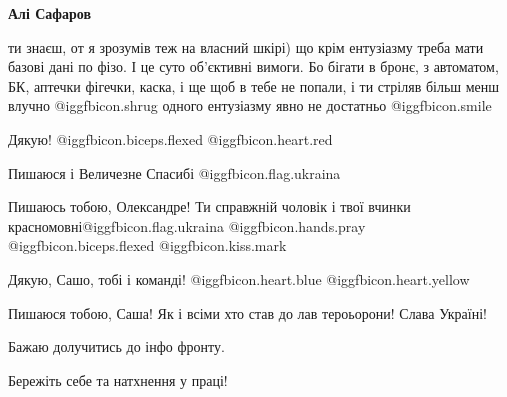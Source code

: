 \begin{itemize}
\begin{itemize}
\textbf{Алі Сафаров} 

ти знаєш, от я зрозумів теж на власний шкірі) що крім ентузіазму треба мати
базові дані по фізо. І це суто об'єктивні вимоги. Бо бігати в бронє, з
автоматом, БК, аптечки фігечки, каска, і ще щоб в тебе не попали, і ти стріляв
більш менш влучно @igg{fbicon.shrug} одного ентузіазму явно не достатньо @igg{fbicon.smile} 

\end{itemize} %

Дякую! @igg{fbicon.biceps.flexed} @igg{fbicon.heart.red}

Пишаюся і Величезне Спасибі @igg{fbicon.flag.ukraina}

Пишаюсь тобою, Олександре! Ти справжній чоловік і твої вчинки красномовні@igg{fbicon.flag.ukraina} @igg{fbicon.hands.pray}  @igg{fbicon.biceps.flexed} @igg{fbicon.kiss.mark} 

Дякую, Сашо, тобі і команді!  @igg{fbicon.heart.blue}  @igg{fbicon.heart.yellow} 

Пишаюся тобою, Саша! Як і всіми хто став до лав тероьорони! Слава Україні!

Бажаю долучитись до інфо фронту.

Бережіть себе та натхнення у праці!

\end{itemize} %
